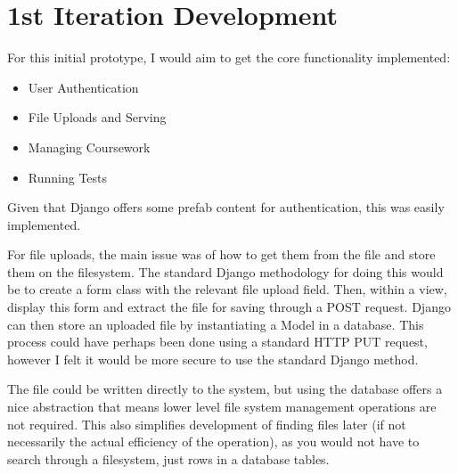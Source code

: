 \documentclass[a4paper,11pt]{report}
\begin{document}
\section{1st Iteration Development}
For this initial prototype, I would aim to get the core functionality implemented:
\begin{itemize}
\item User Authentication
\item File Uploads and Serving
\item Managing Coursework
\item Running Tests
\end{itemize}
Given that Django offers some prefab content for authentication, this was easily implemented.\par
For file uploads, the main issue was of how to get them from the file and store them on the filesystem. The standard Django methodology for doing this would be to create a form class with the relevant file upload field. Then, within a view, display this form and extract the file for saving through a POST request. Django can then store an uploaded file by instantiating a Model in a database. This process could have perhaps been done using a standard HTTP PUT request, however I felt it would be more secure to use the standard Django method.\par
The file could be written directly to the system, but using the database offers a nice abstraction that means lower level file system management operations are not required. This also simplifies development of finding files later (if not necessarily the actual efficiency of the operation), as you would not have to search through a filesystem, just rows in a database tables.\par
\end{document}
